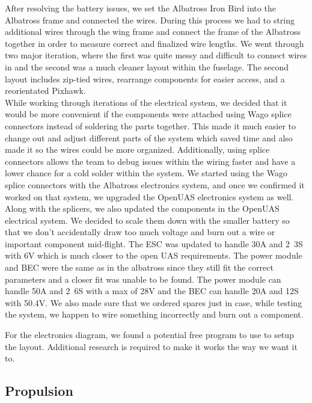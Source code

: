 \documentclass{article}
\begin{document}
\noindent After resolving the battery issues, we set the Albatross Iron Bird into the Albatross frame and connected the wires. During this process we had to string additional wires through the wing frame and connect the frame of the Albatross together in order to measure correct and finalized wire lengths. We went through two major iteration, where the first was quite messy and difficult to connect wires in and the second was a much cleaner layout within the fuselage. The second layout includes zip-tied wires, rearrange components for easier access, and a reorientated Pixhawk. \\

\noindent While working through iterations of the electrical system, we decided that it would be more convenient if the components were attached using Wago splice connectors instead of soldering the parts together. This made it much easier to change out and adjust different parts of the system which saved time and also made it so the wires could be more organized. Additionally, using splice connectors allows the team to debug issues within the wiring faster and have a lower chance for a cold solder within the system. We started using the Wago splice connectors with the Albatross electronics system, and once we confirmed it worked on that system, we upgraded the OpenUAS electronics system as well. \\

\noindent Along with the splicers, we also updated the components in the OpenUAS electrical system. We decided to scale them down with the smaller battery so that we don't accidentally draw too much voltage and burn out a wire or important component mid-flight. The ESC was updated to handle 30A and 2~3S with 6V which is much closer to the open UAS requirements. The power module and BEC were the same as in the albatross since they still fit the correct parameters and a closer fit was unable to be found. The power module can handle 50A and 2~6S with a max of 28V and the BEC can handle 20A and 12S with 50.4V. We also made sure that we ordered spares just in case, while testing the system, we happen to wire something incorrectly and burn out a component.

\noindent For the electronics diagram, we found a potential free program to use to setup the layout. Additional research is required to make it works the way we want it to. 

\subsection{Propulsion}
\end{document}
